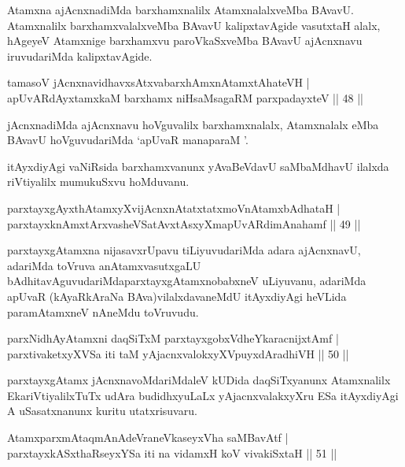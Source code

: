 \begin{artha}%
Atamxna ajAcnxnadiMda barxhamxnalilx AtamxnalalxveMba BAvavU. Atamxnalilx barxhamxvalalxveMba BAvavU kalipxtavAgide vasutxtaH alalx, hAgeyeV Atamxnige barxhamxvu paroVkaSxveMba BAvavU ajAcnxnavu iruvudariMda kalipxtavAgide. 
\end{artha}

\begin{shl}
tamasoV jAcnxnavidhavxsAtxvabarxhAmxnAtamxtAhateVH |\\
apUvARdAyxtamxkaM barxhamx niHsaMsagaRM parxpadayxteV \hfill || 48 ||
\end{shl}

\begin{artha}
jAcnxnadiMda ajAcnxnavu hoVguvalilx barxhamxnalalx, Atamxnalalx eMba BAvavU hoVguvudariMda `apUvaR manaparaM '.

itAyxdiyAgi vaNiRsida barxhamxvanunx yAvaBeVdavU saMbaMdhavU ilalxda riVtiyalilx mumukuSxvu hoMduvanu.
\end{artha}

\begin{shl}
parxtayxgAyxthAtamxyXvijAcnxnAtatxtatxmoVnAtamxbAdhataH |\\
parxtayxknAmxtArxvasheVSatAvxtAsxyXmapUvARdimAnahamf \hfill || 49 ||
\end{shl}

\begin{artha}
parxtayxgAtamxna nijasavxrUpavu tiLiyuvudariMda adara ajAcnxnavU, adariMda toVruva anAtamxvasutxgaLU bAdhitavAguvudariMda\break parxtayxgAtamxnobabxneV uLiyuvanu, adariMda apUvaR (kAyaRkAraNa BAva)vilalxdavaneMdU itAyxdiyAgi heVLida paramAtamxneV nAneMdu toVruvudu.
\end{artha}

\begin{shl}
parxNidhAyA\s \s tamxni daqSiTxM parxtayxgobxVdheYkaracnijxtAmf |\\
parxtivaketxyXVSa iti taM yAjacnxvalokxyXV\s puyxdAradhiVH \hfill || 50 ||
\end{shl}

\begin{artha}%
parxtayxgAtamx jAcnxnavoMdariMdaleV kUDida daqSiTxyanunx Atamxnalilx EkariVtiyalilxTuTx udAra budidhxyuLaLx yAjacnxvalakxyXru ESa itAyxdiyAgi A uSasatxnanunx kuritu utatxrisuvaru.
\end{artha}


\begin{shl}
AtamxparxmAtaqmAnAdeVraneVkaseyxVha saMBavAtf |\\
parxtayxkASxthaRseyxYSa iti na vidamxH koV vivakiSxtaH \hfill || 51 ||
\end{shl}

